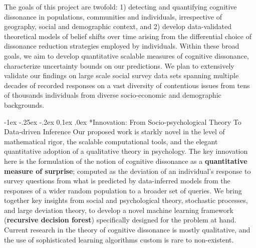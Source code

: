 \documentclass[onecolumn, compsoc,11pt]{IEEEtran}
\makeatletter
\renewcommand\subsection{\@startsection {section}{1}{\z@}%
  {-1ex \@plus -.25ex \@minus -.2ex}%
  {0.1ex \@plus.0ex}%
  {\fontsize{11}{10}\selectfont\bfseries\sffamily\color{DodgerBlue4}}}
\makeatother
\begin{document}
The goals of this project are twofold: 1) detecting and quantifying cognitive dissonance in populations, communities and individuals, irrespective of geography, social and demographic context, and 2) develop data-validated theoretical models of belief shifts over time arising from the differential choice of dissonance reduction strategies employed by individuals. Within these broad goals, we aim to develop quantitative scalable  measures of cognitive dissonance, characterize uncertainty bounds on our predictions. We plan to extensively validate our findings on large scale social survey data sets spanning multiple decades of recorded responses on a vast diversity of contentious issues from tens of thousands individuals from diverse socio-economic and demographic backgrounds. 

\subsection*{Innovation: From Socio-psychological Theory To Data-driven Inference}
Our proposed work is starkly novel in the level of mathematical rigor, the scalable computational tools, and the elegant quantitative adoption of a qualitative theory in psychology. The key innovation here  is the formulation of the notion of cognitive dissonance as a \textbf{quantitative  measure of surprise}; computed as the deviation of an individual's response to
survey questions from what is predicted by data-inferred models from the  responses of a wider random population  to a broader set of queries. We bring together key insights from social and psychological theory, stochastic processes, and large deviation theory, to develop a novel machine learning framework (\textbf{recursive decision forest}) specifically designed for the problem at hand. Current research in the theory of cognitive dissonance is mostly qualitative, and the use of sophisticated learning algorithms custom is rare to non-existent. 
\end{document}
